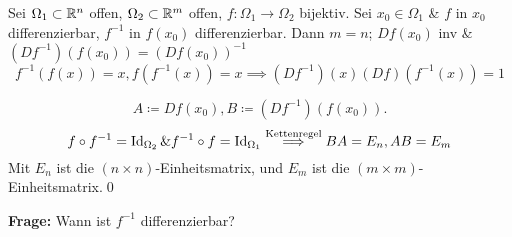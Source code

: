 \begin{theorem}
	Sei $ \Omega_1 \subset \mathbb{R} ^n $ offen, $ \Omega_2 \subset \mathbb{R} ^m $ offen, $ f : \Omega_1 \to \Omega_2 $ bijektiv.
	Sei $ x_0 \in \Omega_1 $ \& $ f $ in $ x_0 $ differenzierbar, $ f^{-1}  $ in $ f(x_0) $ differenzierbar.
	Dann $ m = n $; $ Df(x_0) $ inv \& $ \left( Df^{-1}  \right) \left( f(x_0) \right) = \left( Df(x_0) \right) ^{-1}  $ 
	\[
		f^{-1} (f(x)) = x,
		f(f^{-1} (x)) = x 
		\implies \left( Df^{-1} \right) (x) \left( Df \right) \left( f^{-1} (x) \right) = 1
	\]
\end{theorem}
\begin{proof*}
	\[
		A \coloneqq Df(x_0), B \coloneqq \left( Df^{-1}  \right) \left( f(x_0) \right) .
	\]
	\[
		f \circ f^{-1} = \operatorname{Id}_{\Omega_2} \& f^{-1} \circ f = \operatorname{Id}_{\Omega_1} \overset{\text{Kettenregel} }{\implies } BA = E_n, AB = E_m
	\]
	Mit $ E_n $ ist die $ (n \times n ) $-Einheitsmatrix,
	und $ E_m $ ist die $ (m \times m ) $-Einheitsmatrix.\qed
\end{proof*}

\textbf{Frage:} Wann ist $ f^{-1}  $ differenzierbar?

